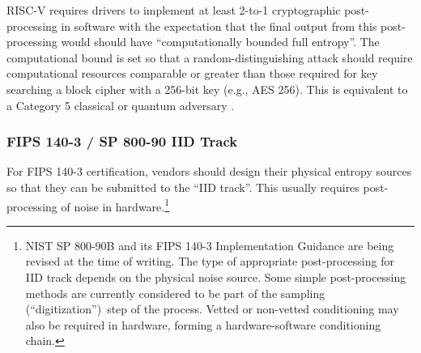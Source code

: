     RISC-V requires drivers to implement at least 2-to-1 cryptographic
    post-processing in software with the expectation that the final output
    from this post-processing would should have ``computationally bounded
    full entropy''.  The computational bound is set so that a
    random-distinguishing attack should require computational resources
    comparable or greater than those required for key searching a block cipher
    with a 256-bit key (e.g., AES 256). This is equivalent to a Category 5
    classical or quantum adversary
    \cite[Section 4.A.4 Security Strength Categories]{NI16}.

    \subsubsection{FIPS 140-3 / SP 800-90 IID Track}

    For FIPS 140-3 certification, vendors should design their physical entropy
    sources so that they can be submitted to the  ``IID track''. This usually
    requires post-processing of noise in hardware.\footnote{NIST SP 800-90B
        \cite{TuBaKe+18} and its  FIPS 140-3 Implementation Guidance
        \cite[Section D.K.]{NICC20} are being revised at the time of writing.
        The type of appropriate post-processing for IID track depends on
        the physical noise source. Some simple post-processing methods are
        currently considered to be part of the sampling (``digitization'')\
        step of the process. Vetted or non-vetted conditioning may also be
        required in hardware, forming a hardware-software conditioning chain.}

